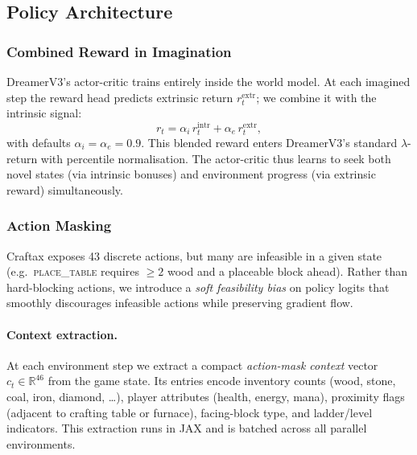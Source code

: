 \documentclass{article}
\begin{document}
\subsection{Policy Architecture}
\label{sec:policy}

\subsubsection{Combined Reward in Imagination}
\label{sec:combined_reward}

DreamerV3's actor-critic trains entirely inside the world model.
At each imagined step the reward head predicts extrinsic return
$r_t^{\mathrm{extr}}$; we combine it with the intrinsic signal:
\begin{equation}
  r_t
  =
  \alpha_i\,r_t^{\mathrm{intr}}
  +
  \alpha_e\,r_t^{\mathrm{extr}},
  \label{eq:combined}
\end{equation}
with defaults $\alpha_i\!=\!\alpha_e\!=\!0.9$.  This blended reward
enters DreamerV3's standard $\lambda$-return with percentile
normalisation.  The actor-critic thus learns to seek both novel states
(via intrinsic bonuses) and environment progress (via extrinsic
reward) simultaneously.

\subsubsection{Action Masking}
\label{sec:masking}

Craftax exposes 43 discrete actions, but many are infeasible in a
given state (e.g.\ \textsc{place\_table} requires $\ge 2$ wood and a
placeable block ahead).  Rather than hard-blocking actions, we
introduce a \emph{soft feasibility bias} on policy logits that
smoothly discourages infeasible actions while preserving gradient flow.

\paragraph{Context extraction.}
At each environment step we extract a compact
\emph{action-mask context} vector
$c_t\!\in\!\mathbb{R}^{46}$ from the game state.  Its entries encode
inventory counts (wood, stone, coal, iron, diamond, \dots), player
attributes (health, energy, mana), proximity flags (adjacent to
crafting table or furnace), facing-block type, and ladder/level
indicators.  This extraction runs in JAX and is batched across all
parallel environments.
\end{document}
